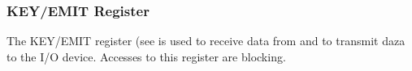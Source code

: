 %
%    

\subsubsection{KEY/EMIT Register}
\label{extensions:key:key}

The KEY/EMIT register (see  is used to receive data from and to transmit daza to the I/O device.
Accesses to this register are blocking.

